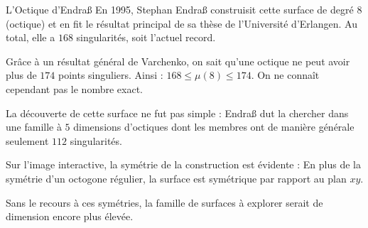 \begin{surferPage}{L'Octique d'Endraß}
     En 1995, Stephan Endraß construisit cette surface de degré $8$ (octique) et en fit 
    le résultat principal de sa thèse de l'Université d'Erlangen.
    Au total, elle a $168$ singularités, soit l'actuel record. 
  
     Grâce à un résultat général de Varchenko, on sait qu'une octique ne peut avoir plus
    de $174$ points singuliers.
    Ainsi : $168 \le \mu(8) \le 174$. 
    On ne connaît cependant pas le nombre exact.

     La découverte de cette surface ne fut pas simple : Endraß dut la chercher
    dans une famille à $5$ dimensions d'octiques dont les membres ont de manière générale
    seulement $112$ singularités.

    Sur l'image interactive, la symétrie de la construction est évidente : 
    En plus de la symétrie d'un octogone régulier, la surface est symétrique
    par rapport au plan $xy$.

    Sans le recours à ces symétries, la famille de surfaces à explorer serait de dimension
    encore plus élevée.
\end{surferPage}
